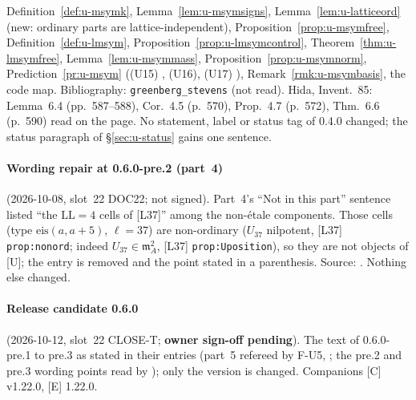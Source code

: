 \documentclass[11pt]{article}
\newcommand{\LL}{\mathrm{LL}}                     %
\begin{document}
Definition~\ref{def:u-msymk}, Lemma~\ref{lem:u-msymsigns}, Lemma~\ref{lem:u-latticeord} (new: ordinary parts are lattice-independent), Proposition~\ref{prop:u-msymfree}, Definition~\ref{def:u-lmsym},
Proposition~\ref{prop:u-lmsymcontrol}, Theorem~\ref{thm:u-lmsymfree}, Lemma~\ref{lem:u-msymmass}, Proposition~\ref{prop:u-msymnorm}, Prediction~\ref{pr:u-msym} ((U15) \PROVED, (U16), (U17) \CONJ),
Remark~\ref{rmk:u-msymbasis}, the code map. Bibliography: \texttt{greenberg\_stevens} (not read). Hida, Invent.\ 85: Lemma~6.4 (pp.~587--588), Cor.~4.5 (p.~570), Prop.~4.7 (p.~572), Thm.~6.6 (p.~590)
read on the page. No statement, label or status tag of 0.4.0 changed; the status paragraph of \S\ref{sec:u-status} gains one sentence.

\paragraph{Wording repair at 0.6.0-pre.2 (part~4)} (2026-10-08, slot~22 DOC22; not signed). Part~4's ``Not in this part'' sentence listed ``the ${\LL}=4$ cells of [L37]'' among the non-étale components. Those cells (type $\mathrm{eis}(a,a{+}5)$, $\ell=37$) are non-ordinary ($U_{37}$ nilpotent, [L37] \texttt{prop:nonord}; indeed $U_{37}\in\mathfrak m_A^{2}$, [L37] \texttt{prop:Uposition}), so they are not objects of [U]; the entry is removed and the point stated in a parenthesis. Source: . Nothing else changed.

\paragraph{Release candidate 0.6.0} (2026-10-12, slot~22 CLOSE-T; \textbf{owner sign-off pending}). The text of 0.6.0-pre.1 to pre.3 as stated in their entries (part~5 refereed by F-U5, ; the pre.2 and pre.3 wording points read by ); only the version is changed. Companions [C] v1.22.0, [E] 1.22.0.
\end{document}
